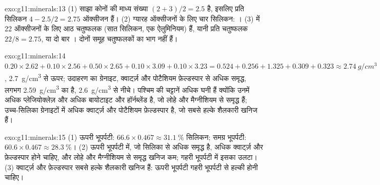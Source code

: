 \begin{solution}{exo:g11:minerals:13}
(1) साझा कोनों की माध्य संख्या $(2 + 3)/2 = 2.5$ है, इसलिए प्रति सिलिकन
$4 - 2.5/2 = 2.75$ ऑक्सीजन हैं। (2) ग्यारह ऑक्सीजनों के लिए चार सिलिकन:
। (3)  में 22 ऑक्सीजनों के लिए आठ चतुष्फलक (सात सिलिकन, एक
ऐलुमिनियम) हैं, यानी प्रति चतुष्फलक $22/8 = 2.75$, या
दो बार । दोनों  समूह चतुष्फलकों का भाग नहीं हैं।
\end{solution}

\begin{solution}{exo:g11:minerals:14}
$0.20 \times 2.62 + 0.10 \times 2.56 + 0.50 \times 2.65 + 0.10 \times 3.09 +
0.10 \times 3.23 = 0.524 + 0.256 + 1.325 + 0.309 + 0.323 \approx
\qty{2.74}{g/cm^3}$, \qty{2.7}{g/cm^3} से ऊपर; उदाहरण का ग्रेनाइट,
क्वार्ट्ज़ और पोटैशियम फ़ेल्डस्पार से अधिक समृद्ध, लगभग \qty{2.59}{g/cm^3} का है,
\qty{2.6}{g/cm^3} से नीचे। पश्चिम की चट्टानें अधिक घनी हैं क्योंकि उनमें अधिक
प्लेजियोक्लेज़ और अधिक बायोटाइट और हॉर्नब्लेंड है, जो लोहे और मैग्नीशियम से समृद्ध हैं;
उच्च-सिलिका ग्रेनाइटों में अधिक क्वार्ट्ज़ और पोटैशियम फ़ेल्डस्पार है, जो सबसे हल्के
शैलकारी खनिज हैं।
\end{solution}

\begin{solution}{exo:g11:minerals:15}
(1) ऊपरी भूपर्पटी: $66.6 \times 0.467 \approx \qty{31.1}{\percent}$ सिलिकन;
समग्र भूपर्पटी: $60.6 \times 0.467 \approx \qty{28.3}{\percent}$। (2) ऊपरी
भूपर्पटी में, जो सिलिका से अधिक समृद्ध है, अधिक क्वार्ट्ज़ और फ़ेल्डस्पार होने चाहिए, और
लोहे और मैग्नीशियम से समृद्ध खनिज कम; गहरी भूपर्पटी में इसका उलटा। (3) क्वार्ट्ज़
और फ़ेल्डस्पार सबसे हल्के शैलकारी खनिज हैं: ऊपरी भूपर्पटी गहरी भूपर्पटी से
हल्की होनी चाहिए।
\end{solution}

